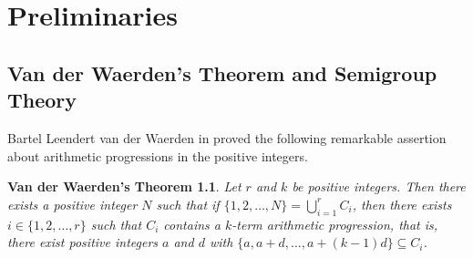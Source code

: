 \documentclass[12pt,showtrims]{memoir}
\theoremstyle{plain}
\newtheorem{vdw}[thm]{Van der Waerden's Theorem}
\theoremstyle{definition}
\begin{document}
\addtolength{\baselineskip}{1.7pt}

\chapter{Preliminaries}

\section{Van der Waerden's Theorem and Semigroup Theory}
Bartel Leendert van der Waerden in \cite{Van-der-Waerden:1927fk} proved the following remarkable assertion about arithmetic progressions in the positive integers.

\begin{vdw}
  Let $r$ and $k$ be positive integers.
  Then there exists a positive integer $N$ such that if $\{1, 2, \ldots, N\} = \bigcup_{i=1}^r C_i$, then there exists $i \in \{1, 2, \ldots, r\}$ such that $C_i$ contains a $k$-term arithmetic progression, that is, there exist positive integers $a$ and $d$ with $\{a, a+d, \ldots, a + (k-1)d\} \subseteq C_i$.
\end{vdw}
 
\end{document}
